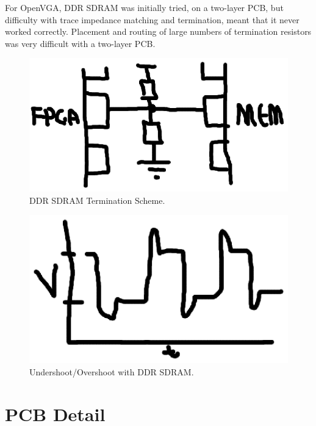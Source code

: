 For OpenVGA, DDR SDRAM was initially tried, on a two-layer PCB, but difficulty
with trace impedance matching and termination, meant that it never worked
correctly. Placement and routing of large numbers of termination resistors was
very difficult with a two-layer PCB.

\begin{figure}
\begin{center}
\includegraphics[width=\linewidth]{images/ddr_term.eps}
\caption{DDR SDRAM Termination Scheme.}
\end{center}
\end{figure}

\begin{figure}
\begin{center}
\includegraphics[width=\linewidth]{images/ddr_overshoot.eps}
\caption[Undershoot/Overshoot with DDR SDRAM]{Undershoot/Overshoot with DDR
SDRAM.}
\end{center}
\end{figure}



\section{PCB Detail}

